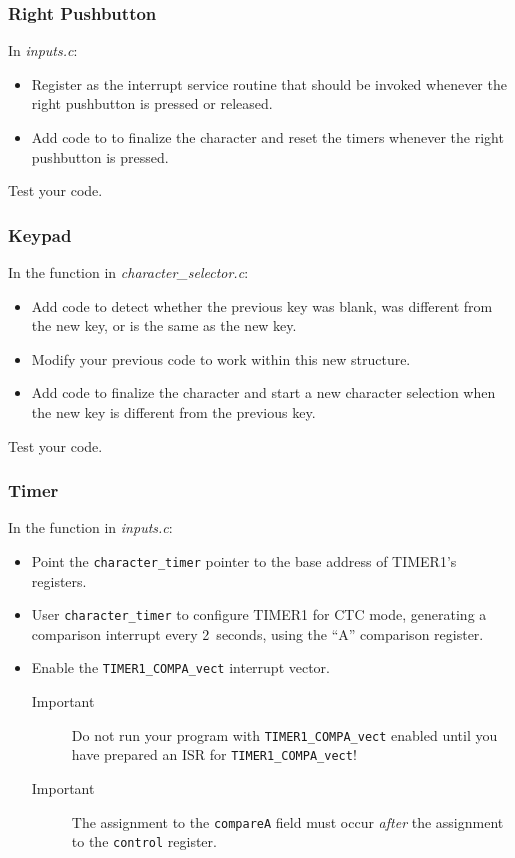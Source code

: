 \subsubsection{Right Pushbutton}

In \textit{inputs.c}:
\begin{itemize}
    \item Register  as the interrupt service routine that should be invoked whenever the right pushbutton is pressed or released.
    \item Add code to  to finalize the character and reset the timers whenever the right pushbutton is pressed.
\end{itemize}

Test your code.

\subsubsection{Keypad}

In the  function in \textit{character\_selector.c}:
\begin{itemize}
    \item Add code to detect whether the previous key was blank, was different from the new key, or is the same as the new key.
    \item Modify your previous code to work within this new structure.
    \item Add code to finalize the character and start a new character selection when the new key is different from the previous key.
\end{itemize}

Test your code.

\subsubsection{Timer}

In the  function in \textit{inputs.c}:
\begin{itemize}
    \item Point the \lstinline{character_timer} pointer to the base address of TIMER1's registers.
    \item User \lstinline{character_timer} to configure TIMER1 for CTC mode, generating a comparison interrupt every 2~seconds, using the ``A'' comparison register.
    \item Enable the \lstinline{TIMER1_COMPA_vect} interrupt vector.
        \begin{description}
            \item[Important] Do not run your program with \lstinline{TIMER1_COMPA_vect} enabled until you have prepared an ISR for \lstinline{TIMER1_COMPA_vect}!
            \item[Important] The assignment to the \lstinline{compareA} field must occur \textit{after} the assignment to the \lstinline{control} register.
        \end{description}
\end{itemize}

